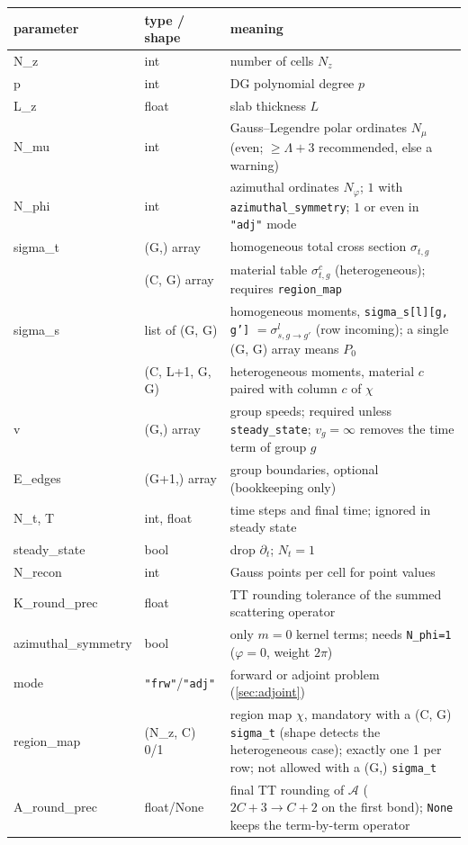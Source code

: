 \documentclass[11pt,a4paper]{article}
\newcommand{\Lmax}{\Lambda}
\newcommand{\code}[1]{\texttt{#1}}
\begin{document}
\begin{longtable}{@{}>{\ttfamily}p{3.6cm}p{2.9cm}p{9.0cm}@{}}
\toprule
\normalfont parameter & type / shape & meaning \\
\midrule
\endhead
N\_z & int & number of cells $N_z$ \\
p & int & DG polynomial degree $p$ \\
L\_z & float & slab thickness $L$ \\
N\_mu & int & Gauss--Legendre polar ordinates $N_\mu$ (even; $\ge\Lmax+3$ recommended, else a warning) \\
N\_phi & int & azimuthal ordinates $N_\varphi$; $1$ with \code{azimuthal\_symmetry}; $1$ or even in \code{"adj"} mode \\
sigma\_t & (G,) array & homogeneous total cross section $\sigma_{t,g}$ \\
 & (C, G) array & material table $\sigma^c_{t,g}$ (heterogeneous); requires \code{region\_map} \\
sigma\_s & list of (G, G) & homogeneous moments, \code{sigma\_s[l][g, g']} $=\sigma^l_{s,g\to g'}$ (row incoming); a single (G, G) array means $P_0$ \\
 & (C, L+1, G, G) & heterogeneous moments, material $c$ paired with column $c$ of $\chi$ \\
v & (G,) array & group speeds; required unless \code{steady\_state}; $v_g=\infty$ removes the time term of group $g$ \\
E\_edges & (G+1,) array & group boundaries, optional (bookkeeping only) \\
N\_t, T & int, float & time steps and final time; ignored in steady state \\
steady\_state & bool & drop $\partial_t$; $N_t=1$ \\
N\_recon & int & Gauss points per cell for point values \\
K\_round\_prec & float & TT rounding tolerance of the summed scattering operator \\
azimuthal\_symmetry & bool & only $m=0$ kernel terms; needs \code{N\_phi=1} ($\varphi=0$, weight $2\pi$) \\
mode & \code{"frw"}/\code{"adj"} & forward or adjoint problem (\cref{sec:adjoint}) \\
region\_map & (N\_z, C) 0/1 & region map $\chi$, mandatory with a (C, G) \code{sigma\_t} (shape detects the heterogeneous case); exactly one 1 per row; not allowed with a (G,) \code{sigma\_t} \\
A\_round\_prec & float/None & final TT rounding of $\mathcal A$ ($2C+3\to C+2$ on the first bond); \code{None} keeps the term-by-term operator \\
\bottomrule
\end{longtable}
\end{document}
